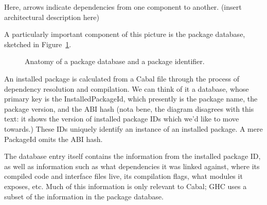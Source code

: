 \documentclass{article}
\begin{document}
Here, arrows indicate dependencies from one component to another.
(insert architectural description here)

A particularly important component of this picture is the package
database, sketched in Figure~\ref{fig:pkgdb}.

\begin{figure}[H]
\label{fig:pkgdb}\caption{Anatomy of a package database and a package identifier.}
\end{figure}

An installed package is calculated from a Cabal file through the process
of dependency resolution and compilation.  We can think of it a
database, whose primary key is the InstalledPackageId, which presently
is the package name, the package version, and the ABI hash (nota bene,
the diagram disagrees with this text: it shows the version of installed
package IDs which we'd like to move towards.)  These IDs uniquely
identify an instance of an installed package.  A mere PackageId omits
the ABI hash.

The database entry itself contains the information from the installed package ID,
as well as information such as what dependencies it was linked against, where
its compiled code and interface files live, its compilation flags, what modules
it exposes, etc.  Much of this information is only relevant to Cabal; GHC
uses a subset of the information in the package database.
\end{document}

